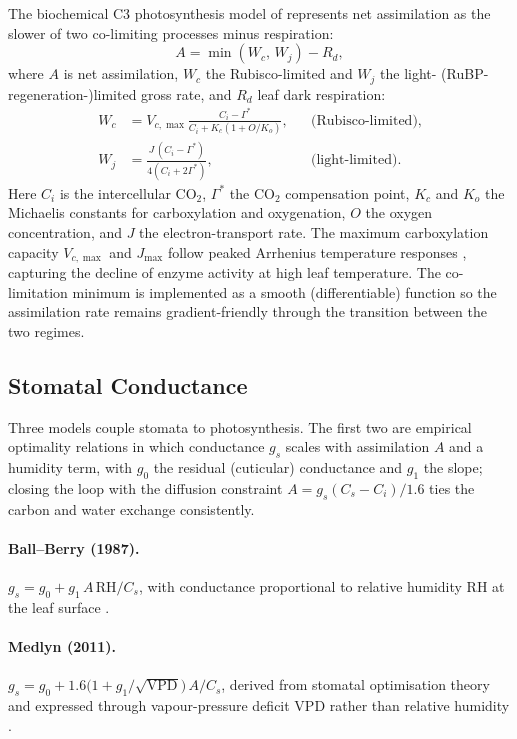 \documentclass[11pt,twoside]{report}
\begin{document}
The biochemical C3 photosynthesis model of \citet{Farquhar1980} represents
net assimilation as the slower of two co-limiting processes minus respiration:
\begin{equation}
  A = \min(W_c,\, W_j) - R_d,
\end{equation}
where $A$ is net assimilation, $W_c$ the Rubisco-limited and $W_j$ the
light- (RuBP-regeneration-)limited gross rate, and $R_d$ leaf dark respiration:
\begin{align}
  W_c &= V_{c,\max}\frac{C_i - \Gamma^*}{C_i + K_c(1+O/K_o)},
  & &\text{(Rubisco-limited)}, \\
  W_j &= \frac{J\,(C_i - \Gamma^*)}{4(C_i + 2\Gamma^*)},
  & &\text{(light-limited)}.
\end{align}
Here $C_i$ is the intercellular CO$_2$, $\Gamma^*$ the CO$_2$ compensation point,
$K_c$ and $K_o$ the Michaelis constants for carboxylation and oxygenation, $O$
the oxygen concentration, and $J$ the electron-transport rate.  The maximum
carboxylation capacity $V_{c,\max}$ and $J_{\max}$ follow peaked Arrhenius
temperature responses \citep{Bernacchi2001}, capturing the decline of enzyme
activity at high leaf temperature.  The co-limitation minimum is implemented as a
smooth (differentiable) function so the assimilation rate remains
gradient-friendly through the transition between the two regimes.

\subsection{Stomatal Conductance}

Three models couple stomata to photosynthesis.  The first two are empirical
optimality relations in which conductance $g_s$ scales with assimilation $A$ and
a humidity term, with $g_0$ the residual (cuticular) conductance and $g_1$ the
slope; closing the loop with the diffusion constraint $A=g_s(C_s-C_i)/1.6$ ties
the carbon and water exchange consistently.

\paragraph{Ball--Berry (1987).}
$g_s = g_0 + g_1\,A\,\mathrm{RH}/C_s$, with conductance proportional to relative
humidity $\mathrm{RH}$ at the leaf surface \citep{Ball1987}.

\paragraph{Medlyn (2011).}
$g_s = g_0 + 1.6\bigl(1+g_1/\!\sqrt{\mathrm{VPD}}\bigr)\,A/C_s$, derived from
stomatal optimisation theory and expressed through vapour-pressure deficit
$\mathrm{VPD}$ rather than relative humidity \citep{Medlyn2011}.
\end{document}
